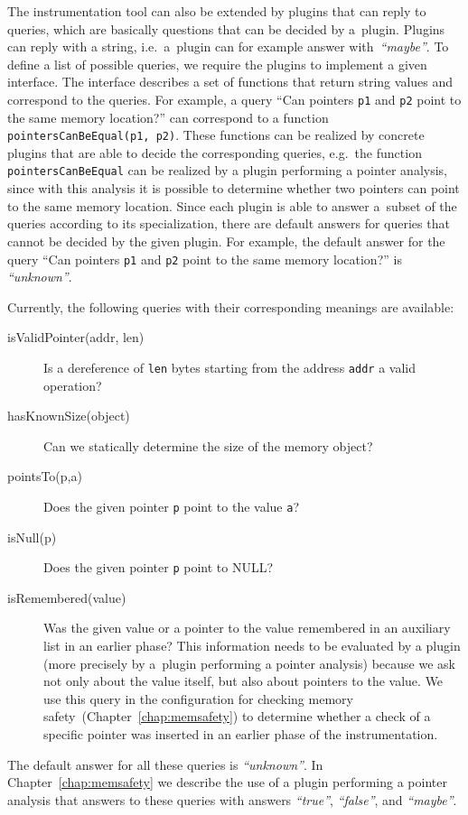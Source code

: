 The instrumentation tool can also be extended by plugins that can reply to
queries, which are basically questions that can be decided by a~plugin. Plugins
can reply with a string, i.e.~a~plugin can for example answer
with~\emph{``maybe''}.  To define a list of possible queries, we require the
plugins to implement a given interface. The interface describes a set of
functions that return string values and correspond to the queries. For example,
a query ``Can pointers \texttt{p1} and \texttt{p2} point to the same memory
location?'' can correspond to a function \texttt{pointersCanBeEqual(p1, p2)}.
These functions can be realized by concrete plugins that are able to decide
the corresponding queries, e.g.~the function \texttt{pointersCanBeEqual} can be
realized by a plugin performing a pointer analysis, since with this analysis
it is possible to determine whether two pointers can point to the same memory
location. Since each plugin is able to answer a~subset of the queries
according to its specialization, there are default answers for queries that
cannot be decided by the given plugin. For example, the default answer for the
query ``Can pointers \texttt{p1} and \texttt{p2} point to the same memory
location?'' is \emph{``unknown''}.

Currently, the following queries with their corresponding meanings are available:
\begin{description}
  \item[isValidPointer(addr, len)] Is a dereference of \texttt{len} bytes
  starting from the address \texttt{addr} a valid operation?
    \item[hasKnownSize(object)] Can we statically determine the size of the memory
         object?
  \item[pointsTo(p,a)] Does the given pointer \texttt{p} point to the value \texttt{a}?
  \item[isNull(p)] Does the given pointer \texttt{p} point to NULL?
  \item[isRemembered(value)] Was the given value or a pointer to the value
  remembered in an auxiliary list in an earlier phase? This information needs
  to be evaluated by a plugin (more precisely by a~plugin performing a pointer
  analysis) because we ask not only about the value itself, but also about
  pointers to the value. We use this query in the configuration for checking
  memory safety~(Chapter~\ref{chap:memsafety}) to
  determine whether a check of a specific pointer was inserted in an earlier
  phase of the instrumentation.
\end{description}
The default answer for all these queries is \emph{``unknown''}. In
Chapter~\ref{chap:memsafety} we describe the use of a plugin performing a
pointer analysis that answers to these queries with answers \emph{``true''},
\emph{``false''}, and \emph{``maybe''}.

